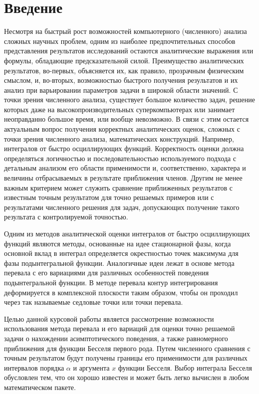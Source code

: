 \documentclass[14pt]{extarticle}
\begin{document}
\section*{Введение}
Несмотря на быстрый рост возможностей компьютерного (численного) анализа сложных научных проблем, одним из наиболее предпочтительных способов представления результатов исследований остаются аналитические выражения или формулы, обладающие предсказательной силой. Преимущество аналитических результатов, во-первых, объясняется их, как правило, прозрачным физическим смыслом, и, во-вторых, возможностью быстрого получения результатов и их анализ при варьировании параметров задачи в широкой области значений. С точки зрения численного анализа, существует большое количество задач, решение которых даже на высокопроизводительных суперкомпьютерах или занимает неоправданно большое время, или вообще невозможно. В связи с этим остается актуальным вопрос получения корректных аналитических оценок, сложных с точки зрения численного анализа, математических конструкций. Например, интегралов от быстро осциллирующих функций. Корректность оценки должна определяться логичностью и последовательностью используемого подхода с детальным анализом его области применимости и, соответственно, характера и величины отбрасываемых в результате приближения членов. Другим не менее важным критерием может служить сравнение приближенных результатов с известным точным результатом для точно решаемых примеров или с результатами численного решения для задач, допускающих получение такого результата с контролируемой точностью.

Одним из методов аналитической оценки интегралов от быстро осциллирующих функций являются методы, основанные на идее стационарной фазы, когда основной вклад в интеграл определяется окрестностью точек максимума для фазы подынтегральной функции. Аналогичные идеи лежат в основе метода перевала с его вариациями для различных особенностей поведения подынтегральной функции.  
В методе перевала контур интегрирования деформируется в комплексной плоскости таким образом, чтобы он проходил через так называемые седловые точки или точки перевала.

Целью данной курсовой работы является рассмотрение возможности использования метода перевала и его вариаций для оценки точно решаемой задачи о нахождении асимптотического поведения, а также равномерного приближения для функции Бесселя первого рода. Путем численного сравнения с точным результатом будут получены границы его применимости для различных интервалов порядка $\alpha$ и аргумента $x$ функции Бесселя. Выбор интеграла Бесселя обусловлен тем, что он хорошо известен и может быть легко вычислен в любом математическом пакете.
\end{document}
